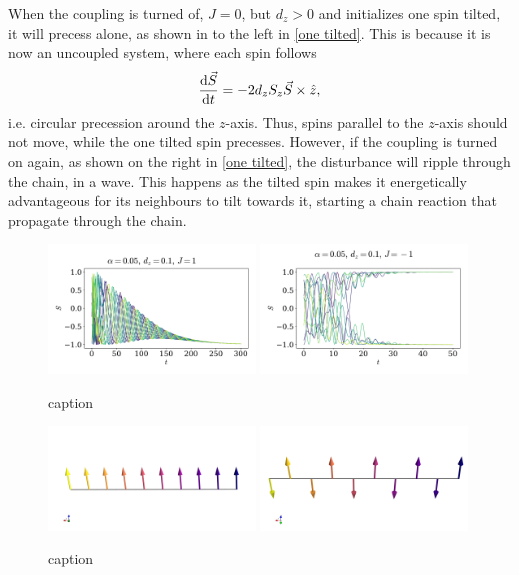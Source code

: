 \documentclass{article}
\begin{document}
    When the coupling is turned of, $J = 0$, but $d_z>0$ and initializes one spin tilted, it will precess alone, as shown in to the left in \autoref{one tilted}. This is because it is now an uncoupled system, where each spin follows 
    \begin{equation*}
        \dv{\vec S}{t} = - 2 d_z S_z \vec S \times \hat z, 
    \end{equation*}
    i.e. circular precession around the $z$-axis. Thus, spins parallel to the $z$-axis should not move, while the one tilted spin precesses. However, if the coupling is turned on again, as shown on the right in \autoref{one tilted}, the disturbance will ripple through the chain, in a wave. This happens as the tilted spin makes it energetically advantageous for its neighbours to tilt towards it, starting a chain reaction that propagate through the chain. 

    \begin{figure}[H]
        \centering
        \includegraphics[width=0.49\textwidth]{../plots/ground_state_f.pdf}
        \includegraphics[width=0.49\textwidth]{../plots/ground_state_af.pdf}
        \caption{caption}
        \label{ground states}
    \end{figure}
    \begin{figure}[H]
        \centering
        \includegraphics[width=0.49\textwidth]{../plots/ground_state_f3D.png}
        \includegraphics[width=0.49\textwidth]{../plots/ground_state_af3D.png}
        \caption{caption}
        \label{ground states 3D}
    \end{figure}
\end{document}
